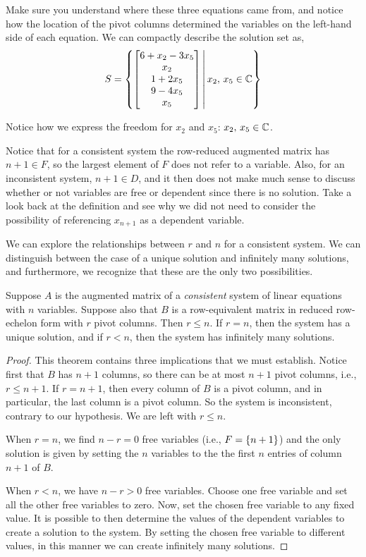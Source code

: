 \documentclass{ximera}
\begin{document}
\begin{example}
\begin{feedback}[correct]
  Make sure you understand where these three equations came from, and
  notice how the location of the pivot columns determined the
  variables on the left-hand side of each equation.  We can compactly
  describe the solution set as,
  \[
    S=
    \left\lbrace
      \begin{bmatrix}6+x_2-3x_5\\x_2\\1+2x_5\\9-4x_5\\x_5\end{bmatrix}
    \,\middle|\,x_2,\,x_5\in\mathbb{C}\right\rbrace
  \]
  
  Notice how we express the freedom for $x_2$ and $x_5$: $x_2,\,x_5\in\mathbb{C}$.
\end{feedback}
\end{example}

Notice that for a consistent system the row-reduced augmented matrix
has $n+1\in F$, so the largest element of $F$ does not refer to a
variable.  Also, for an inconsistent system, $n+1\in D$, and it then
does not make much sense to discuss whether or not variables are free
or dependent since there is no solution.  Take a look back at the
definition and see why we did not need to consider the possibility of
referencing $x_{n+1}$ as a dependent variable.

We can explore the relationships between $r$ and $n$ for a consistent
system.  We can distinguish between the case of a unique solution and
infinitely many solutions, and furthermore, we recognize that these
are the only two possibilities.

\begin{theorem}
\label{theorem:CSRN}

Suppose $A$ is the augmented matrix of a \textit{consistent} system of
linear equations with $n$ variables.  Suppose also that $B$ is a
row-equivalent matrix in reduced row-echelon form with $r$ pivot
columns.  Then $r\leq n$.  If $r=n$, then the system has a unique
solution, and if $r<n$, then the system has infinitely many solutions.

\begin{proof}
  This theorem contains three implications that we must establish.
  Notice first that $B$ has $n+1$ columns, so there can be at most
  $n+1$ pivot columns, i.e., $r\leq n+1$.  If $r=n+1$, then every
  column of $B$ is a pivot column, and in particular, the last column
  is a pivot column.  So the system is inconsistent, contrary to our
  hypothesis. We are left with $r\leq n$.

  When $r=n$, we find $n-r=0$ free variables (i.e., $F=\left\{n+1\right\}$) and
  the only solution is given by setting the $n$ variables to the the
  first $n$ entries of column $n+1$ of $B$.

  When $r<n$, we have $n-r>0$ free variables.  Choose one free
  variable and set all the other free variables to zero.  Now, set the
  chosen free variable to any fixed value.  It is possible to then
  determine the values of the dependent variables to create a solution
  to the system.  By setting the chosen free variable to different
  values, in this manner we can create infinitely many solutions.
\end{proof}
\end{theorem}
\end{document}
